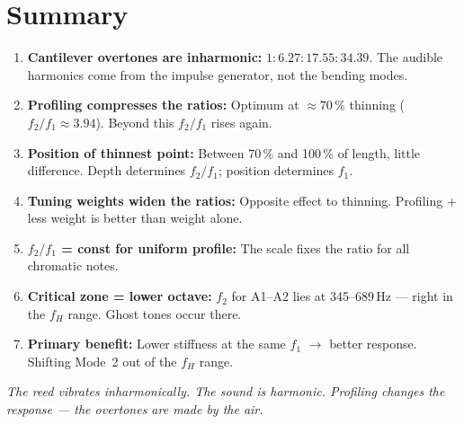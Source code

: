 \documentclass[11pt,a4paper]{article}
\begin{document}
\section{Summary}

\begin{enumerate}
\item \textbf{Cantilever overtones are inharmonic:}
  $1 : 6{.}27 : 17{.}55 : 34{.}39$. The audible harmonics come
  from the impulse generator, not the bending modes.
\item \textbf{Profiling compresses the ratios:} Optimum at
  $\approx 70\,\%$ thinning ($f_2/f_1 \approx 3{.}94$). Beyond this
  $f_2/f_1$ rises again.
\item \textbf{Position of thinnest point:} Between 70\,\% and 100\,\% of
  length, little difference. Depth determines $f_2/f_1$; position
  determines $f_1$.
\item \textbf{Tuning weights widen the ratios:} Opposite effect to thinning.
  Profiling + less weight is better than weight alone.
\item \textbf{$f_2/f_1$ = const for uniform profile:} The scale
  fixes the ratio for all chromatic notes.
\item \textbf{Critical zone = lower octave:} $f_2$ for A1--A2
  lies at 345--689\,Hz --- right in the $f_H$ range. Ghost tones occur there.
\item \textbf{Primary benefit:} Lower stiffness at the same $f_1$
  $\to$ better response. Shifting Mode~2 out of the $f_H$ range.
\end{enumerate}

\bigskip
\textit{The reed vibrates inharmonically. The sound is harmonic.
Profiling changes the response --- the overtones are made by the air.}
\end{document}
